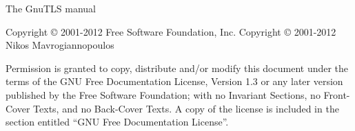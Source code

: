 \thispagestyle{empty}

\begin{center}
\huge{The GnuTLS manual}
\end{center}



\newpage

\thispagestyle{empty}


\begin{flushleft}
Copyright \copyright{} 2001-2012 Free Software Foundation, Inc.
Copyright \copyright{} 2001-2012 Nikos Mavrogiannopoulos
\end{flushleft}

\begin{flushleft}
Permission is granted to copy, distribute and/or modify this document
under the terms of the GNU Free Documentation License, Version 1.3 or
any later version published by the Free Software Foundation; with no
Invariant Sections, no Front-Cover Texts, and no Back-Cover Texts.  A
copy of the license is included in the section entitled ``GNU Free
Documentation License''.
\end{flushleft}

